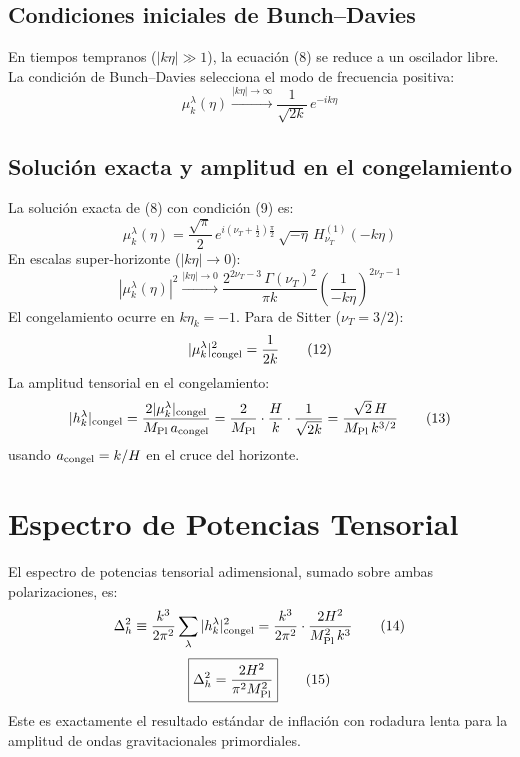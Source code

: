 \documentclass[12pt,a4paper]{article}
\begin{document}
\subsection{Condiciones iniciales de Bunch--Davies}

En tiempos tempranos ($|k\eta| \gg 1$), la ecuación (8) se reduce a un oscilador libre. La condición de Bunch--Davies selecciona el modo de frecuencia positiva:
\begin{equation}
\mu_k^\lambda(\eta) \xrightarrow{|k\eta|\to\infty} \frac{1}{\sqrt{2k}}\,e^{-ik\eta} \tag{9}
\end{equation}

\subsection{Solución exacta y amplitud en el congelamiento}

La solución exacta de (8) con condición (9) es:
\begin{equation}
\mu_k^\lambda(\eta) = \frac{\sqrt{\pi}}{2}\,e^{i(\nu_T + \tfrac{1}{2})\frac{\pi}{2}}\,\sqrt{-\eta}\,H_{\nu_T}^{(1)}(-k\eta) \tag{10}
\end{equation}
En escalas super-horizonte ($|k\eta| \to 0$):
\begin{equation}
|\mu_k^\lambda(\eta)|^2 \xrightarrow{|k\eta|\to 0} \frac{2^{2\nu_T - 3}\,\Gamma(\nu_T)^2}{\pi k}\left(\frac{1}{-k\eta}\right)^{2\nu_T - 1} \tag{11}
\end{equation}
El congelamiento ocurre en $k\eta_k = -1$. Para de Sitter ($\nu_T = 3/2$):
\begin{equation}
|\mu_k^\lambda|_{\rm congel}^2 = \frac{1}{2k} \tag{12}
\end{equation}
La amplitud tensorial en el congelamiento:
\begin{equation}
|h_k^\lambda|_{\rm congel} = \frac{2|\mu_k^\lambda|_{\rm congel}}{M_{\rm Pl}\,a_{\rm congel}} = \frac{2}{M_{\rm Pl}}\cdot\frac{H}{k}\cdot\frac{1}{\sqrt{2k}} = \frac{\sqrt{2}\,H}{M_{\rm Pl}\,k^{3/2}} \tag{13}
\end{equation}
usando $a_{\rm congel} = k/H$ en el cruce del horizonte.

\section{Espectro de Potencias Tensorial}

El espectro de potencias tensorial adimensional, sumado sobre ambas polarizaciones, es:
\begin{equation}
\Delta_h^2 \equiv \frac{k^3}{2\pi^2}\sum_\lambda |h_k^\lambda|_{\rm congel}^2 = \frac{k^3}{2\pi^2}\cdot\frac{2H^2}{M_{\rm Pl}^2\,k^3} \tag{14}
\end{equation}
\begin{equation}
\boxed{\Delta_h^2 = \frac{2H^2}{\pi^2 M_{\rm Pl}^2}} \tag{15}
\end{equation}
Este es exactamente el resultado estándar de inflación con rodadura lenta para la amplitud de ondas gravitacionales primordiales.
\end{document}
